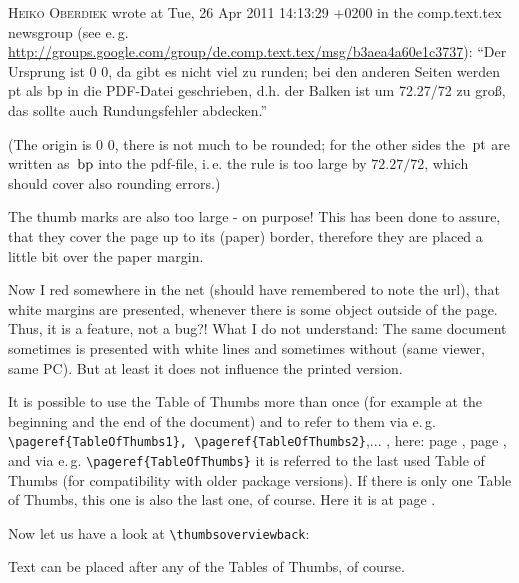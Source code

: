 \documentclass[twoside,british]{article}[2007/10/19]%
\gdef\unit#1{\mathord{\thinspace\mathrm{#1}}}
\begin{document}
\textsc{Heiko Oberdiek} wrote at Tue, 26 Apr 2011 14:13:29 +0200
in the \newline
comp.text.tex newsgroup (see e.\,g. \newline
\url{http://groups.google.com/group/de.comp.text.tex/msg/b3aea4a60e1c3737}):\newline
\textquotedblleft Der Ursprung ist 0 0,
da gibt es nicht viel zu runden; bei den anderen Seiten
werden pt als bp in die PDF-Datei geschrieben, d.h.
der Balken ist um 72.27/72 zu gro\ss{}, das
sollte auch Rundungsfehler abdecken.\textquotedblright

(The origin is 0 0, there is not much to be rounded;
for the other sides the $\unit{pt}$ are written as $\unit{bp}$ into
the pdf-file, i.\,e. the rule is too large by $72.27/72$, which
should cover also rounding errors.)

The thumb marks are also too large - on purpose! This has been done
to assure, that they cover the page up to its (paper) border,
therefore they are placed a little bit over the paper margin.

Now I red somewhere in the net (should have remembered to note the url),
that white margins are presented, whenever there is some object outside
of the page. Thus, it is a feature, not a bug?!
What I do not understand: The same document sometimes is presented
with white lines and sometimes without (same viewer, same PC).\newline
But at least it does not influence the printed version.

\newpage

\pagecolor{white}

It is possible to use the Table of Thumbs more than once (for example
at the beginning and the end of the document) and to refer to them via e.\,g.
\verb|\pageref{TableOfThumbs1}, \pageref{TableOfThumbs2}|,... ,
here: page \pageref{TableOfThumbs1}, page \pageref{TableOfThumbs2},
and via e.\,g. \verb|\pageref{TableOfThumbs}| it is referred to the last used
Table of Thumbs (for compatibility with older package versions).
If there is only one Table of Thumbs, this one is also the last one, of course.
Here it is at page \pageref{TableOfThumbs}.\newline

Now let us have a look at \verb|\thumbsoverviewback|:

%

\newpage

Text can be placed after any of the Tables of Thumbs, of course.
\end{document}
